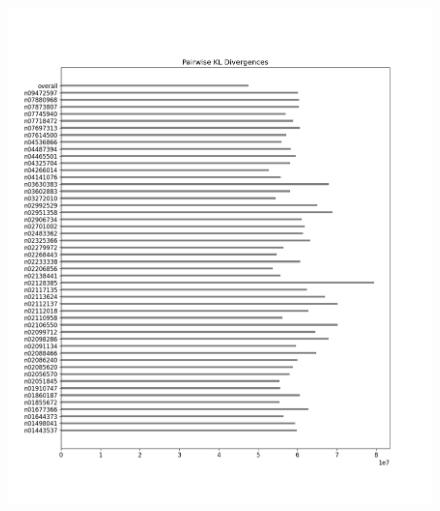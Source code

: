 \documentclass{article}
\begin{document}
\begin{figure}[H]
\begin{minipage}{0.45\textwidth}
            \includegraphics[width=\textwidth]{cross_imagenet_imgr_r_third_last_untrained/alexnet_kl_div_a_to_bpairwise.png} %
            

\end{minipage}
\end{figure}
\end{document}
